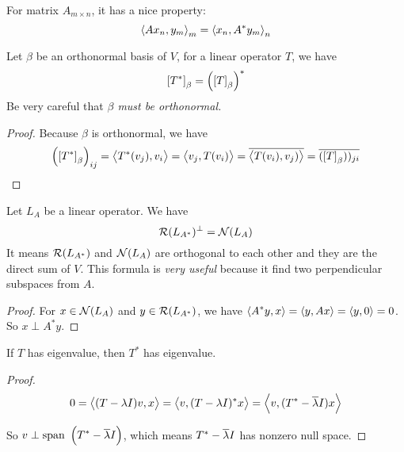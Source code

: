 For matrix $A_{m \times n}$, it has a nice property:
\begin{equation}
    \left\langle \displaystyle A x_n, y_m \right\rangle_m = \left\langle \displaystyle x_n, A^* y_m \right\rangle_n
\end{equation}

\begin{theorem}\label{operator_conjugate_transpose_requirement}
    Let $\beta$ be an orthonormal basis of $V$, for a linear operator $T$, we have
    \begin{equation}
        \coordinate{T^*}_\beta = \left(\coordinate{T}_\beta\right)^*
    \end{equation}
    Be very careful that \emph{$\beta$ must be orthonormal.}
\end{theorem}
\begin{proof}
    Because $\beta$ is orthonormal, we have
    \begin{equation*}
        \left(\coordinate{T^*}_\beta\right)_{ij} = \innerproduct{T^* (v_j)}{v_i} = \innerproduct{v_j}{T(v_i)} = \conjugate{\innerproduct{T(v_i)}{v_j)}} = \conjugate{(\coordinate{T}_\beta))_{ji}}
    \end{equation*}
\end{proof}

\begin{theorem}
    Let $L_A$ be a linear operator. We have
    \begin{equation}
        \mathcal{R}(L_{A^*})^\perp = \mathcal{N}(L_A)
    \end{equation}
    It means $\mathcal{R}(L_{A^*})$ and $\mathcal{N}(L_A)$ are orthogonal to each other and they are the direct sum of $V$. This formula is \emph{very useful} because it find two perpendicular subspaces from $A$.
\end{theorem}
\begin{proof}
    For $x \in \mathcal{N}(L_A)$ and $y \in \mathcal{R}(L_{A^*})$, we have $\left\langle \displaystyle A^*y, x \right\rangle = \left\langle \displaystyle y, Ax \right\rangle = \left\langle \displaystyle y, 0 \right\rangle = 0$. So $x \perp A^*y$.
\end{proof}



\begin{theorem}\label{congjugate_transpose_has_eigenvalue}
    If $T$ has eigenvalue, then $T^*$ has eigenvalue.    
\end{theorem}
\begin{proof}
    \begin{equation*}
        0 = \left\langle \displaystyle (T-\lambda I)v, x \right\rangle = \left\langle \displaystyle v, (T-\lambda I)^* x \right\rangle = \left\langle \displaystyle v, (T^* - \overline{\lambda}I) x \right\rangle
    \end{equation*}
    
    So $v \perp \displaystyle \mathrm{span}~\left( T^* - \overline{\lambda}I \right)$, which means $T^* - \overline{\lambda}I$ has nonzero null space.
\end{proof}

